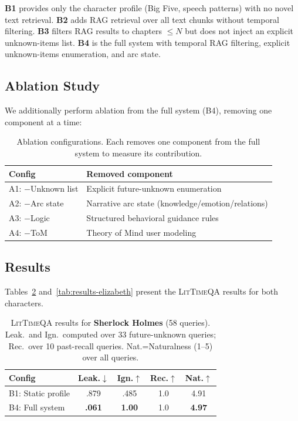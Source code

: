 \documentclass[11pt,a4paper]{article}
\begin{document}
\noindent \textbf{B1} provides only the character profile (Big Five, speech patterns) with no novel text retrieval.
\textbf{B2} adds RAG retrieval over all text chunks without temporal filtering.
\textbf{B3} filters RAG results to chapters $\leq N$ but does not inject an explicit unknown-items list.
\textbf{B4} is the full system with temporal RAG filtering, explicit unknown-items enumeration, and arc state.

\subsection{Ablation Study}
\label{sec:ablation}

We additionally perform ablation from the full system (B4), removing one component at a time:

\begin{table}[t]
\centering
\small
\begin{tabular}{@{}ll@{}}
\toprule
\textbf{Config} & \textbf{Removed component} \\
\midrule
A1: $-$Unknown list & Explicit future-unknown enumeration \\
A2: $-$Arc state    & Narrative arc state (knowledge/emotion/relations) \\
A3: $-$Logic        & Structured behavioral guidance rules \\
A4: $-$ToM          & Theory of Mind user modeling \\
\bottomrule
\end{tabular}
\caption{Ablation configurations. Each removes one component from the full system to measure its contribution.}
\label{tab:ablations}
\end{table}

\subsection{Results}
\label{sec:results}

Tables~\ref{tab:results-holmes} and~\ref{tab:results-elizabeth} present the \textsc{LitTimeQA} results for both characters.

\begin{table}[t]
\centering
\small
\begin{tabular}{@{}lcccc@{}}
\toprule
\textbf{Config} & \textbf{Leak.}$\downarrow$ & \textbf{Ign.}$\uparrow$ & \textbf{Rec.}$\uparrow$ & \textbf{Nat.}$\uparrow$ \\
\midrule
B1: Static profile & .879 & .485 & 1.0 & 4.91 \\
B4: Full system & \textbf{.061} & \textbf{1.00} & 1.0 & \textbf{4.97} \\
\bottomrule
\end{tabular}
\caption{\textsc{LitTimeQA} results for \textbf{Sherlock Holmes} (58 queries). Leak.\ and Ign.\ computed over 33 future-unknown queries; Rec.\ over 10 past-recall queries. Nat.=Naturalness (1--5) over all queries.}
\label{tab:results-holmes}
\end{table}
\end{document}
